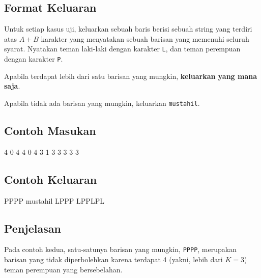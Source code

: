 \documentclass[../main_problemset.tex]{subfiles} %
\begin{document}
\subsection*{Format Keluaran}

Untuk setiap kasus uji, keluarkan sebuah baris berisi sebuah string yang terdiri atas $ A + B $ karakter yang menyatakan sebuah barisan yang memenuhi seluruh syarat. Nyatakan teman laki-laki dengan karakter \texttt{L}, dan teman perempuan dengan karakter \texttt{P}.

Apabila terdapat lebih dari satu barisan yang mungkin, \textbf{keluarkan yang mana saja}.

Apabila tidak ada barisan yang mungkin, keluarkan \texttt{mustahil}.

\vspace{.4cm}

\begin{minipage}[t]{0.5\textwidth}
\subsection*{Contoh Masukan}

\begin{lcverbatim}
4
0 4 4
0 4 3
1 3 3
3 3 3
\end{lcverbatim}
\end{minipage}
\begin{minipage}[t]{0.5\textwidth}
\subsection*{Contoh Keluaran}

\begin{lcverbatim}
PPPP
mustahil
LPPP
LPPLPL
\end{lcverbatim}
\end{minipage}

\subsection*{Penjelasan}

Pada contoh kedua, satu-satunya barisan yang mungkin, \texttt{PPPP}, merupakan barisan yang tidak diperbolehkan karena terdapat 4 (yakni, lebih dari $ K=3 $) teman perempuan yang bersebelahan.
\end{document}
